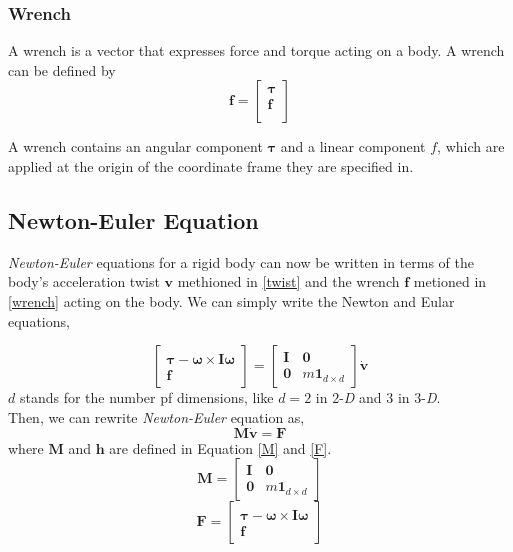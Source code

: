     \subsubsection{Wrench}
        A wrench is a vector that expresses force and torque acting on a body. A wrench can be defined by
        \begin{equation}
            \mathbf{f} = \left[ \begin{array}{c} \pmb{\tau} \\ \pmb{f} \\ \end{array} \right]
            \label{wrench} 
        \end{equation}

        A wrench contains an angular component $\pmb{\tau}$ and a linear component $f$, which are applied at the origin of the coordinate frame they are specified in.


\subsection{Newton-Euler Equation}
    \textit{Newton-Euler} equations for a rigid body can now be written in terms of the body's acceleration twist $\mathbf{v}$ methioned in \ref{twist} and the wrench $\mathbf{f}$ metioned in \ref{wrench} acting on the body. We can simply write the Newton and Eular equations,

    \begin{equation}
        \left[ \begin{array}{c} \pmb{\tau} - \pmb{\omega} \times \pmb{I} \pmb{\omega}\\ \pmb{f} \end{array}\right] = \left[ \begin{array}{cc} \pmb{I} & \pmb{0} \\ \pmb{0}& m\pmb{1}_{d\times d}\end{array} \right] \dot{\mathbf{v}}
    \end{equation}
    $d$ stands for the number pf dimensions, like $d=2$ in $2$-\textit{D} and $3$ in $3$-\textit{D}. \\

    Then, we can rewrite \textit{Newton-Euler} equation as,
    \begin{equation}
        \pmb{M}\dot{\mathbf{v}} = \mathbf{F}
        \label{eq:newton}
    \end{equation}
    where $\pmb{M}$ and $\mathbf{h}$ are defined in Equation \ref{M} and \ref{F}.
    \begin{equation}
        \pmb{M} = \left[ \begin{array}{cc} \pmb{I} & \pmb{0} \\ \pmb{0} & m\pmb{1}_{d \times d}\end{array} \right]
        \label{M}
    \end{equation}
    \begin{equation}
        \mathbf{F} = \left[ \begin{array}{c} \pmb{\tau} - \pmb{\omega} \times \pmb{I} \pmb{\omega}\\ \pmb{f} \end{array}\right]
        \label{F}
    \end{equation}


